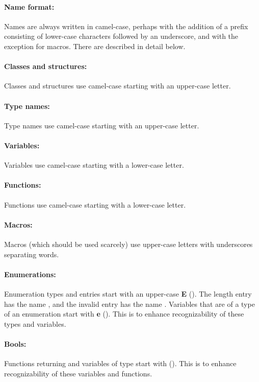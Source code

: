 \documentclass[footinclude=false,11pt,DIV11]{scrartcl}
\begin{document}
\paragraph{Name format:} Names are always written in camel-case, perhaps with the
addition of a prefix consisting of lower-case characters followed by an underscore,
and with the exception for macros. There are described in detail below.

\paragraph{Classes and structures:} Classes and structures use camel-case
starting with an upper-case letter.

\paragraph{Type names:} Type names use camel-case starting with an upper-case 
letter.

\paragraph{Variables:} Variables use camel-case starting with a lower-case letter.

\paragraph{Functions:} Functions use camel-case starting with a lower-case letter.

\paragraph{Macros:} Macros (which should be used scarcely) use upper-case 
letters with underscores separating words.

\paragraph{Enumerations:} Enumeration types and entries start with an upper-case
\textbf{E} (\Etype). The length entry has the name , and the 
invalid entry has the name . Variables that are of a type of an 
enumeration start with \textbf{e} (\etype). This is to enhance recognizability 
of these types and variables.

\paragraph{Bools:} Functions returning  and variables of type 
start with  (\btype). This is to enhance recognizability of these variables
and functions.
\end{document}
